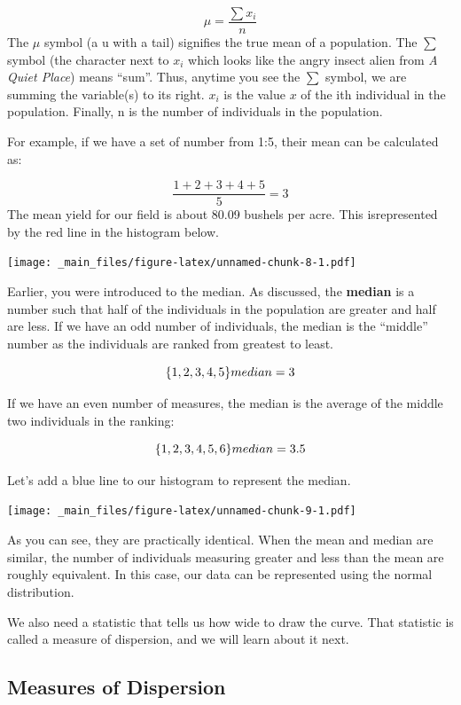 \documentclass[
]{book}
\begin{document}
\[\displaystyle \mu = \frac{\sum x_i}{n}\] The \(\mu\) symbol (a u with a
tail) signifies the true mean of a population. The \(\sum\) symbol (the
character next to \(x_i\) which looks like the angry insect alien from \emph{A
Quiet Place}) means ``sum''. Thus, anytime you see the \(\sum\) symbol, we
are summing the variable(s) to its right. \(x_i\) is the value \(x\) of the
ith individual in the population. Finally, n is the number of
individuals in the population.

For example, if we have a set of number from 1:5, their mean can be
calculated as:

\[
\frac{1+2+3+4+5}{5} = 3
\] The mean yield for our field is about 80.09 bushels per acre. This
isrepresented by the red line in the histogram below.

\texttt{[image: \_main\_files/figure-latex/unnamed-chunk-8-1.pdf]}

Earlier, you were introduced to the median. As discussed, the \textbf{median}
is a number such that half of the individuals in the population are
greater and half are less. If we have an odd number of individuals, the
median is the ``middle'' number as the individuals are ranked from
greatest to least.

\[ \{1,2,3,4,5\} \\ median = 3 \]

If we have an even number of measures, the median is the average of the
middle two individuals in the ranking:

\[\{1,2,3,4,5,6\} \\ median = 3.5 \]

Let's add a blue line to our histogram to represent the median.

\texttt{[image: \_main\_files/figure-latex/unnamed-chunk-9-1.pdf]}

As you can see, they are practically identical. When the mean and median
are similar, the number of individuals measuring greater and less than
the mean are roughly equivalent. In this case, our data can be
represented using the normal distribution.

We also need a statistic that tells us how wide to draw the curve. That
statistic is called a measure of dispersion, and we will learn about it
next.

\hypertarget{measures-of-dispersion}{%
\subsection{Measures of Dispersion}\label{measures-of-dispersion}}
\end{document}
